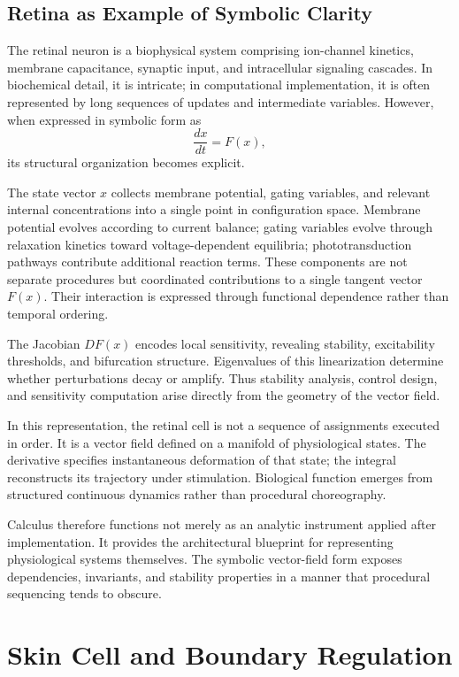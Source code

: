 \documentclass[12pt]{book}
\begin{document}
\section{Retina as Example of Symbolic Clarity}

The retinal neuron is a biophysical system comprising ion-channel
kinetics, membrane capacitance, synaptic input, and intracellular
signaling cascades. In biochemical detail, it is intricate; in
computational implementation, it is often represented by long
sequences of updates and intermediate variables. However, when
expressed in symbolic form as
\[
\frac{dx}{dt} = F(x),
\]
its structural organization becomes explicit.

The state vector $x$ collects membrane potential, gating variables,
and relevant internal concentrations into a single point in
configuration space. Membrane potential evolves according to current
balance; gating variables evolve through relaxation kinetics toward
voltage-dependent equilibria; phototransduction pathways contribute
additional reaction terms. These components are not separate
procedures but coordinated contributions to a single tangent vector
$F(x)$. Their interaction is expressed through functional dependence
rather than temporal ordering.

The Jacobian $DF(x)$ encodes local sensitivity, revealing stability,
excitability thresholds, and bifurcation structure. Eigenvalues of
this linearization determine whether perturbations decay or amplify.
Thus stability analysis, control design, and sensitivity computation
arise directly from the geometry of the vector field.

In this representation, the retinal cell is not a sequence of
assignments executed in order. It is a vector field defined on a
manifold of physiological states. The derivative specifies
instantaneous deformation of that state; the integral reconstructs
its trajectory under stimulation. Biological function emerges from
structured continuous dynamics rather than procedural choreography.

Calculus therefore functions not merely as an analytic instrument
applied after implementation. It provides the architectural blueprint
for representing physiological systems themselves. The symbolic
vector-field form exposes dependencies, invariants, and stability
properties in a manner that procedural sequencing tends to obscure.

\chapter{Skin Cell and Boundary Regulation}
\end{document}
